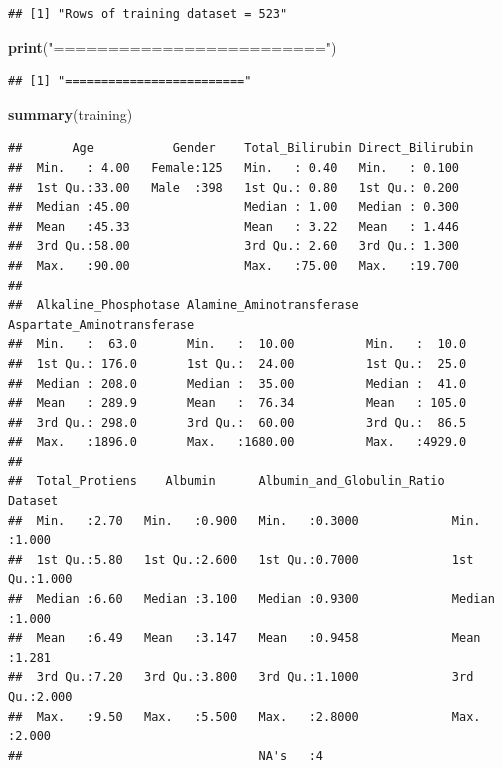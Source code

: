 \documentclass[]{article}
\newenvironment{Shaded}{\begin{snugshade}}{\end{snugshade}}
\newcommand{\KeywordTok}[1]{\textcolor[rgb]{0.13,0.29,0.53}{\textbf{#1}}}
\newcommand{\NormalTok}[1]{#1}
\newcommand{\StringTok}[1]{\textcolor[rgb]{0.31,0.60,0.02}{#1}}
\begin{document}
\begin{verbatim}
## [1] "Rows of training dataset = 523"
\end{verbatim}

\begin{Shaded}
\begin{Highlighting}[]
\KeywordTok{print}\NormalTok{(}\StringTok{"========================="}\NormalTok{)}
\end{Highlighting}
\end{Shaded}

\begin{verbatim}
## [1] "========================="
\end{verbatim}

\begin{Shaded}
\begin{Highlighting}[]
\KeywordTok{summary}\NormalTok{(training)}
\end{Highlighting}
\end{Shaded}

\begin{verbatim}
##       Age           Gender    Total_Bilirubin Direct_Bilirubin
##  Min.   : 4.00   Female:125   Min.   : 0.40   Min.   : 0.100  
##  1st Qu.:33.00   Male  :398   1st Qu.: 0.80   1st Qu.: 0.200  
##  Median :45.00                Median : 1.00   Median : 0.300  
##  Mean   :45.33                Mean   : 3.22   Mean   : 1.446  
##  3rd Qu.:58.00                3rd Qu.: 2.60   3rd Qu.: 1.300  
##  Max.   :90.00                Max.   :75.00   Max.   :19.700  
##                                                               
##  Alkaline_Phosphotase Alamine_Aminotransferase Aspartate_Aminotransferase
##  Min.   :  63.0       Min.   :  10.00          Min.   :  10.0            
##  1st Qu.: 176.0       1st Qu.:  24.00          1st Qu.:  25.0            
##  Median : 208.0       Median :  35.00          Median :  41.0            
##  Mean   : 289.9       Mean   :  76.34          Mean   : 105.0            
##  3rd Qu.: 298.0       3rd Qu.:  60.00          3rd Qu.:  86.5            
##  Max.   :1896.0       Max.   :1680.00          Max.   :4929.0            
##                                                                          
##  Total_Protiens    Albumin      Albumin_and_Globulin_Ratio    Dataset     
##  Min.   :2.70   Min.   :0.900   Min.   :0.3000             Min.   :1.000  
##  1st Qu.:5.80   1st Qu.:2.600   1st Qu.:0.7000             1st Qu.:1.000  
##  Median :6.60   Median :3.100   Median :0.9300             Median :1.000  
##  Mean   :6.49   Mean   :3.147   Mean   :0.9458             Mean   :1.281  
##  3rd Qu.:7.20   3rd Qu.:3.800   3rd Qu.:1.1000             3rd Qu.:2.000  
##  Max.   :9.50   Max.   :5.500   Max.   :2.8000             Max.   :2.000  
##                                 NA's   :4
\end{verbatim}
\end{document}
